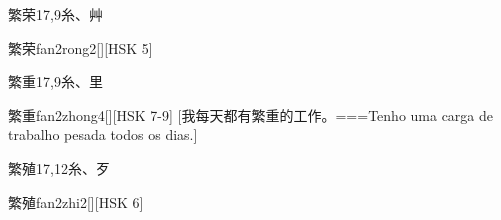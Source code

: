 \begin{Entry}{繁荣}{17,9}{⽷、⾋}
  \begin{Phonetics}{繁荣}{fan2rong2}[][HSK 5]
  \end{Phonetics}
\end{Entry}

\begin{Entry}{繁重}{17,9}{⽷、⾥}
  \begin{Phonetics}{繁重}{fan2zhong4}[][HSK 7-9]
    [我每天都有繁重的工作。===Tenho uma carga de trabalho pesada todos os dias.]
  \end{Phonetics}
\end{Entry}

\begin{Entry}{繁殖}{17,12}{⽷、⽍}
  \begin{Phonetics}{繁殖}{fan2zhi2}[][HSK 6]
  \end{Phonetics}
\end{Entry}


